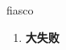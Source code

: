 
\begin{frame}
{\huge fiasco}
\begin{center}
\begin{enumerate}\Large
  \item \textbf{大失败}
\end{enumerate}
\end{center}
\end{frame}
